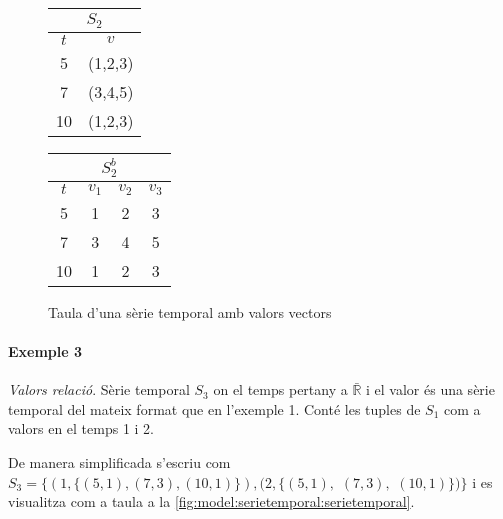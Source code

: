 \begin{figure}[tp]
  \centering
  \begin{tabular}{|c|c|}
    \multicolumn{2}{c}{$S_2$} \\ \hline
    $t$  & $v$ \\ \hline
    5  & (1,2,3) \\
    7  & (3,4,5) \\
    10 & (1,2,3) \\ \hline
  \end{tabular} \qquad
  \begin{tabular}[tp]{|c|c|c|c|}
   \multicolumn{4}{c}{$S_2^b$} \\ \hline
    $t$  & $v_1$ & $v_2$ & $v_3$ \\ \hline
    5  & 1 & 2 & 3 \\
    7  & 3 & 4 & 5 \\
    10 & 1 & 2 & 3 \\ \hline
  \end{tabular}

  \caption{Taula d'una sèrie temporal amb valors vectors}
  \label{fig:model:serietemporal:vector}
\end{figure}


\paragraph{Exemple 3} \emph{Valors relació}. \label{par:model:exemple-relvalues}
Sèrie temporal $S_3$ on el temps pertany a $\bar{\mathbb{R}}$ i el valor és una sèrie temporal del mateix format que en l'exemple 1. Conté les tuples de $S_1$ com a valors en el temps 1 i 2. 

De manera simplificada s'escriu com
$S_3 =  \{ (1,\{ (5,1), (7,3), (10,1) \}), 
(2,\{ (5,1),$ $(7,3),$ $(10,1) \}) \}$
i es visualitza com a taula a la \autoref{fig:model:serietemporal:serietemporal}.


